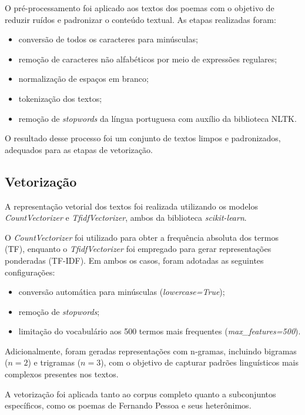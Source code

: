 \documentclass[
	article,
	12pt,
	oneside,
	a4paper,
	english,
	brazil,
	sumario=tradicional
]{abntex2}
\begin{document}
O pré-processamento foi aplicado aos textos dos poemas com o objetivo de reduzir ruídos e padronizar o conteúdo textual. As etapas realizadas foram:

\begin{itemize}
    \item conversão de todos os caracteres para minúsculas;
    \item remoção de caracteres não alfabéticos por meio de expressões regulares;
    \item normalização de espaços em branco;
    \item tokenização dos textos;
    \item remoção de \textit{stopwords} da língua portuguesa com auxílio da biblioteca NLTK.
\end{itemize}

O resultado desse processo foi um conjunto de textos limpos e padronizados, adequados para as etapas de vetorização.

\subsection{Vetorização}

A representação vetorial dos textos foi realizada utilizando os modelos \textit{CountVectorizer} e \textit{TfidfVectorizer}, ambos da biblioteca \textit{scikit-learn}.

O \textit{CountVectorizer} foi utilizado para obter a frequência absoluta dos termos (TF), enquanto o \textit{TfidfVectorizer} foi empregado para gerar representações ponderadas (TF-IDF). Em ambos os casos, foram adotadas as seguintes configurações:

\begin{itemize}
    \item conversão automática para minúsculas (\textit{lowercase=True});
    \item remoção de \textit{stopwords};
    \item limitação do vocabulário aos 500 termos mais frequentes (\textit{max\_features=500}).
\end{itemize}

Adicionalmente, foram geradas representações com n-gramas, incluindo bigramas ($n=2$) e trigramas ($n=3$), com o objetivo de capturar padrões linguísticos mais complexos presentes nos textos.

A vetorização foi aplicada tanto ao corpus completo quanto a subconjuntos específicos, como os poemas de Fernando Pessoa e seus heterônimos.
\end{document}
